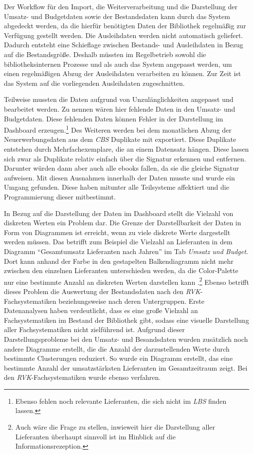 Der Workflow für den Import, die Weiterverarbeitung und die Darstellung der Umsatz- und Budgetdaten sowie der Bestandsdaten kann durch das System
abgedeckt werden, da die hierfür benötigten Daten der Bibliothek regelmäßig zur Verfügung gestellt werden. Die Ausleihdaten werden nicht automatisch
geliefert. Dadurch entsteht eine Schieflage zwischen Bestands- und Ausleihdaten in Bezug auf die Bestandsgröße.
Deshalb müssten im Regelbetrieb sowohl die bibliotheksinternen Prozesse und als auch das System angepasst werden, um einen regelmäßigen Abzug der Ausleihdaten
verarbeiten zu können. Zur Zeit ist das System auf die vorliegenden Ausleihdaten zugeschnitten.

Teilweise mussten die Daten aufgrund von Unzulänglichkeiten angepasst und bearbeitet werden.
Zu nennen wären hier fehlende Daten in den Umsatz- und Budgetdaten. Diese fehlenden Daten können Fehler in der Darstellung im Dashboard erzeugen.\footnote{Ebenso fehlen noch relevante Lieferanten, die sich nicht im \textit{\acrshort{LBS}} finden lassen.}
Des Weiteren werden bei dem monatlichen Abzug der Neuerwerbungsdaten aus dem \textit{\acrshort{CBS}} Duplikate mit exportiert. Diese Duplikate entstehen durch
Mehrfachexemplare, die an einem Datensatz hängen. Diese lassen sich zwar als Duplikate relativ einfach über die Signatur erkennen und entfernen.
Darunter würden dann aber auch alle ebooks fallen, da sie die gleiche Signatur aufweisen. Mit diesen Ausnahmen innerhalb der Daten musste und wurde ein Umgang gefunden. Diese haben mitunter alle Teilsysteme affektiert und
die Programmierung dieser mitbestimmt.

In Bezug auf die Darstellung der Daten im Dashboard stellt die Vielzahl von diskreten Werten ein Problem dar. 
Die Grenze der Darstellbarkeit der Daten in Form von Diagrammen ist erreicht, wenn zu viele diskrete Werte dargestellt werden müssen.
Das betrifft zum Beispiel die Vielzahl an Lieferanten in dem Diagramm \enquote{Gesamtumsatz Lieferanten nach Jahren} im Tab \textit{Umsatz und Budget}. 
Dort kann anhand der Farbe in den gestapelten Balkendiagramm nicht mehr zwischen den einzelnen Lieferanten unterschieden werden, da die Color-Palette 
nur eine bestimmte Anzahl an diskreten Werten darstellen kann \cite[vgl.][]{plotly_discrete_2021}.\footnote{Auch wäre die Frage zu stellen, inwieweit hier die Darstellung aller Lieferanten 
überhaupt sinnvoll ist im Hinblick auf die Informationsrezeption.}
Ebenso betrifft dieses Problem die Auswertung der Bestandsdaten nach den \textit{\acrshort{RVK}}-Fachsystematiken beziehungsweise nach deren Untergruppen. 
Erste Datenanalysen haben verdeutlicht, dass es eine große Vielzahl an Fachsystematiken im Bestand der Bibliothek gibt, sodass eine visuelle Darstellung aller Fachsystematiken nicht zielführend ist.
Aufgrund dieser Darstellungsprobleme bei den Umsatz- und Besandsdaten wurden zusätzlich noch andere Diagramme erstellt, die die Anzahl der darzustellenden Werte durch bestimmte Clusterungen reduziert.
So wurde ein Diagramm erstellt, das eine bestimmte Anzahl der umsatzstärksten Lieferanten im Gesamtzeitraum zeigt. Bei den \textit{\acrshort{RVK}}-Fachsystematiken wurde ebenso
verfahren.



